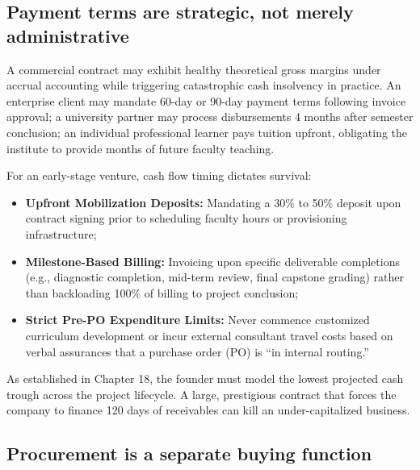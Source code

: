 \subsection{Payment terms are strategic, not merely administrative}

A commercial contract may exhibit healthy theoretical gross margins under accrual accounting while triggering catastrophic cash insolvency in practice. An enterprise client may mandate 60-day or 90-day payment terms following invoice approval; a university partner may process disbursements 4 months after semester conclusion; an individual professional learner pays tuition upfront, obligating the institute to provide months of future faculty teaching.

For an early-stage venture, cash flow timing dictates survival:
\begin{itemize}
\item \textbf{Upfront Mobilization Deposits:} Mandating a 30\% to 50\% deposit upon contract signing prior to scheduling faculty hours or provisioning infrastructure;
\item \textbf{Milestone-Based Billing:} Invoicing upon specific deliverable completions (e.g., diagnostic completion, mid-term review, final capstone grading) rather than backloading 100\% of billing to project conclusion;
\item \textbf{Strict Pre-PO Expenditure Limits:} Never commence customized curriculum development or incur external consultant travel costs based on verbal assurances that a purchase order (PO) is ``in internal routing.''
\end{itemize}
As established in Chapter 18, the founder must model the lowest projected cash trough across the project lifecycle. A large, prestigious contract that forces the company to finance 120 days of receivables can kill an under-capitalized business.

\subsection{Procurement is a separate buying function}

